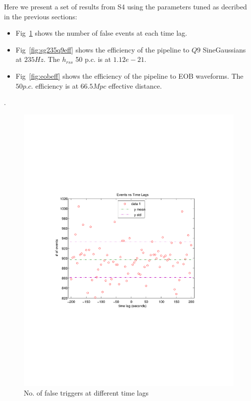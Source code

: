 Here we present a set of results from S4 using the parameters tuned
as decribed in the previous sections:
\begin{itemize}
\item Fig~\ref{fig:eventsvstimelag} shows the number of false events 
at each time lag.
\item Fig~\ref{fig:sg235q9eff} shows the efficiency of the pipeline to 
$Q9$ SineGaussians at $235 Hz$. The $h_{rss}$ 50 p.c. is at $1.12e-21$.
\item Fig~\ref{fig:eobeff} shows the efficiency of the pipeline to 
EOB waveforms. The $50 p.c.$ efficiency is at $66.5 Mpc$ effective distance.   
\end{itemize}.
\begin{figure}[h]
\begin{center}
\includegraphics[width=1.0\textwidth]{figures/eventsvstimelag_20050829_1}
\caption{No. of false triggers at different time lags}
\label{fig:eventsvstimelag}
\end{center}
\end{figure}


